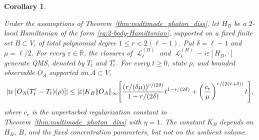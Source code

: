 \documentclass[11pt]{article}
\theoremstyle{myplain}
\newtheorem{cor}[cor]{Corollary}
\theoremstyle{mydefinition}
\theoremstyle{remark}
\DeclareMathOperator{\cL}{\mathcal{L}}
\DeclareMathOperator{\1}{\mathds{1}}
\newcommand{\tr}[1][]{\operatorname{tr}%
  \ifx#1\empty \else \left[ #1 \right] \fi}
\begin{document}
        \begin{cor}\label{cor:local-polynomial-perturbation}
            
            Under the assumptions of Theorem~\ref{thm:multimode_photon_diss}, let $H_B$ be a $2$-local Hamiltonian of the form \eqref{eq:2-body-Hamiltonian}, supported on a fixed finite set $B \subset V$, of total polynomial degree $1 \le r < 2(\ell - 1)$. Put $\delta = \ell - 1$ and $\mu = \ell/2$. For every $\varepsilon \in \mathbb R$, the closures of $\cL_\ell^{(H)}$ and $\cL_\ell^{(H)} - i\varepsilon[H_B,\cdot]$ generate QMS, denoted by $T_t$ and $T_t^\varepsilon$. For every $t \ge 0$, state $\rho$, and bounded observable $O_A$ supported on $A \subset V$,
            \begin{equation}
                \begin{split}
                    \left|\tr[O_A(T_t^\varepsilon-T_t)(\rho)]\right|
                    \le |\varepsilon|K_B\|O_A\|_\infty\Bigg[
                    \frac{(r/(\delta\mu))^{r/(2\delta)}}{1-r/(2\delta)}
                    t^{1-r/(2\delta)}
                    +\left(\frac{c_r}{\mu}\right)^{r/(2(r+\delta))}t
                    \Bigg],
                \end{split}
            \end{equation}
            where $c_r$ is the unperturbed regularization constant in Theorem~\ref{thm:multimode_photon_diss} with $\eta = 1$. The constant $K_B$ depends on $H_B$, $B$, and the fixed concentration parameters, but not on the ambient volume.
            
        \end{cor}
\end{document}
